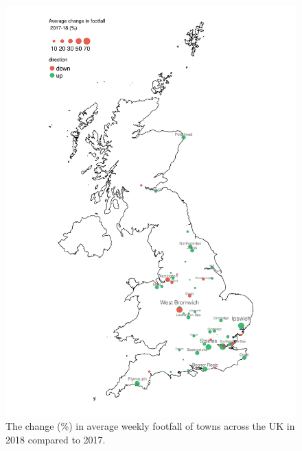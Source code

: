 
\cleartoleftpage
\begin{figure}
  \forceversofloat
  \includegraphics[trim={0 0 0 0},clip]{images/applications-cities-rank.png}
  \caption{The change (\%) in average weekly footfall of towns across the UK in 2018 compared to 2017.}
  \label{figure:applications:cities:change}
\end{figure}

